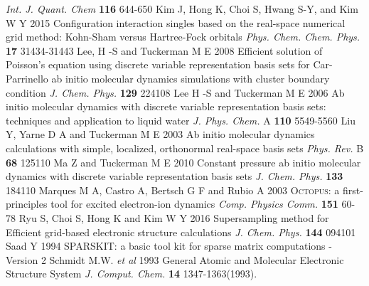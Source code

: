 \begin{thebibliography}{9}
\textit{Int. J. Quant. Chem} \textbf{116} 644-650
%
 Kim J, Hong K, Choi S, Hwang S-Y, and Kim W Y 2015
Configuration interaction singles based on the real-space numerical grid method:
Kohn-Sham versus Hartree-Fock orbitals
\textit{Phys. Chem. Chem. Phys.} \textbf{17} 31434-31443
%
 Lee, H -S and Tuckerman M E 2008
Efficient solution of Poisson's equation using discrete variable
representation basis sets for Car-Parrinello ab initio molecular
dynamics simulations with cluster boundary condition
\textit{J. Chem. Phys.} \textbf{129} 224108
%
 Lee H -S and Tuckerman M E 2006
Ab initio molecular dynamics with discrete variable representation basis sets:
techniques and application to liquid water
\textit{J. Phys. Chem.} A \textbf{110} 5549-5560
%
 Liu Y, Yarne D A and Tuckerman M E 2003
Ab initio molecular dynamics calculations with simple, localized, orthonormal
real-space basis sets
\textit{Phys. Rev.} B \textbf{68} 125110
%
 Ma Z and Tuckerman M E 2010
Constant pressure ab initio molecular dynamics with discrete variable representation basis sets
\textit{J. Chem. Phys.} \textbf{133} 184110
%
 Marques M A, Castro A, Bertsch G F and Rubio A 2003
\textsc{Octopus}: a first-principles tool for excited electron-ion dynamics
\textit{Comp. Physics Comm.} \textbf{151} 60-78
%
 Ryu S, Choi S, Hong K and Kim W Y 2016
Supersampling method for Efficient grid-based electronic structure calculations
\textit{J. Chem. Phys.} \textbf{144} 094101
%
 Saad Y 1994
SPARSKIT: a basic tool kit for sparse matrix computations - Version 2
%
 Schmidt M.W. \textit{et al} 1993
General Atomic and Molecular Electronic Structure System
\textit{J. Comput. Chem.} \textbf{14} 1347-1363(1993).
\end{thebibliography}